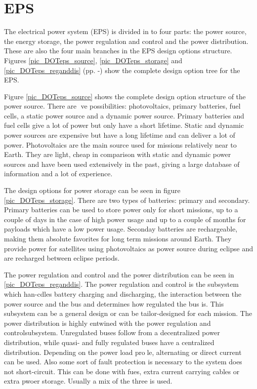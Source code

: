\section{\acl{EPS}}
\label{designOptionsPower}

The electrical power system (EPS) is divided in to four parts: the power source, the energy storage, the power regulation and control and the power distribution. These are also the four main branches in the EPS design options structure. Figures \ref{pic_DOTeps_source}, \ref{pic_DOTeps_storage} and \ref{pic_DOTeps_reganddis} (pp. \pageref{pic_DOTeps_source}-\pageref{pic_DOTeps_reganddis}) show the complete design option tree for the EPS.

Figure \ref{pic_DOTeps_source} shows the complete design option structure of the power source. There are ve possibilities: photovoltaics, primary batteries, fuel
cells, a static power source and a dynamic power source. Primary batteries and fuel cells give a lot of power but only have a short lifetime. Static and dynamic power sources are expensive but have a long lifetime and can deliver a lot of power. Photovoltaics are the main source used for missions relatively near to Earth. They are light, cheap in comparison with static and dynamic power sources and have been used extensively in the past, giving a large database of information and a lot of experience.

The design options for power storage can be seen in figure \ref{pic_DOTeps_storage}. There are two types of batteries: primary and secondary. Primary batteries can
be used to store power only for short missions, up to a couple of days in the case of high power usage and up to a couple of months for payloads
which have a low power usage. Seconday batteries are rechargeable, making them absolute favorites for long term missions around Earth. They provide
power for satellites using photovoltaics as power source during eclipse and are recharged between eclipse periods.

The power regulation and control and the power distribution can be seen in \ref{pic_DOTeps_reganddis}. The power regulation and control is the subsystem which han-cdles battery charging and discharging, the interaction between the power source and the bus and determines how regulated the bus is. This subsystem can be a general design or can be tailor-designed for each mission. 
The power distribution is highly entwined with the power regulation and controlsubsystem. Unregulated buses follow from a decentralized power distribution, while quasi- and fully regulated buses have a centralized distribution. Depending on the power load prole, alternating or direct current can be used. Also some sort of fault protection is necessary to the system does not short-circuit. This can be done with fues, extra current carrying cables or extra pwoer storage. Usually a mix of the three is used.